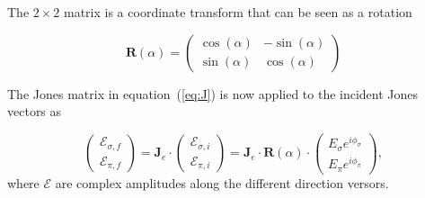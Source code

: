 \documentclass{iucr}
\begin{document}
The $2\times 2$ matrix is a coordinate transform that can be seen as a rotation

\begin{equation}\label{eq:rotation}
  \textbf{R}(\alpha)
  =
  \left( \begin{array}{cc}
    \cos(\alpha) & -\sin(\alpha) \\
    \sin(\alpha) & \cos(\alpha)
 \end{array} \right)
\end{equation}





The Jones matrix in equation~(\ref{eq:J}) is now applied to the incident Jones vectors as

\begin{equation}
  \left( \begin{array}{c}
    \mathcal{E}_{\sigma,f} \\
    \mathcal{E}_{\pi,f}
  \end{array} \right)
  =
    \textbf{J}_e \cdot
  \left( \begin{array}{c}
    \mathcal{E}_{\sigma,i} \\
    \mathcal{E}_{\pi,i}
  \end{array} \right)
  =
  \textbf{J}_e \cdot \textbf{R}(\alpha) \cdot
  \left( \begin{array}{c}
    E_{\sigma} e^{i \phi_{\sigma}} \\
    E_{\pi} e^{i \phi_{\pi}}
  \end{array} \right),
\end{equation}
where $\mathcal{E}$ are complex amplitudes along the different direction versors.
\end{document}
